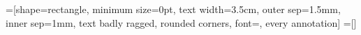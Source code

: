 
=[shape=rectangle,
                        minimum size=0pt,
                        text width=3.5cm,
                        outer sep=1.5mm,
                        inner sep=1mm,
                        text badly ragged,
                        rounded corners,
                        font=\pgfutil@font@tiny,
                        every annotation]
=[]




\def\tikz@mindmap@annotation[#1]{%
  {%
    \let\tikz@mm@at=\pgfutil@empty%
    \let\tikz@mm@name=\pgfutil@empty%
    \let\tikzmindmapinserttitle=\pgfutil@empty%
    \let\tikzmindmapinsertnumber=\pgfutil@empty%
    \tikz@orig@setkeys*{tikz@mm@anno}{#1}%
    \edef\tikz@marshal{%
      \noexpand\node%
      [%
      \XKV@rm,%
      annotation,%
      ]%
      {%
        \ifx\tikz@mm@url\pgfutil@empty\else%
        \fi%
      }%
    }%
  }%
  \pgfutil@ifnextchar;{\pgfutil@gobble}{}%
}


\endinput

